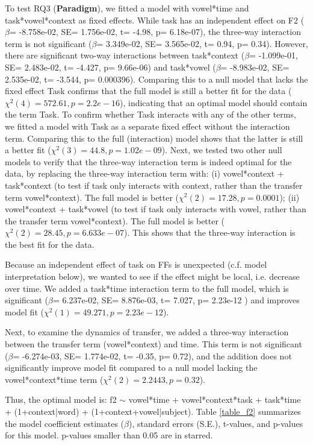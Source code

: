 \documentclass[12 pt]{article}
\begin{document}
To test RQ3 (\textbf{Paradigm}), we fitted a model with vowel*time and task*vowel*context as fixed effects. While task has an independent effect on F2 ($\beta$= -8.758e-02, SE= 1.756e-02, t= -4.98, p= 6.18e-07), the three-way interaction term is not significant ($\beta$= 3.349e-02, SE= 3.565e-02, t= 0.94, p= 0.34). However, there are significant two-way interactions between task*context ($\beta$= -1.099e-01, SE= 2.483e-02, t= -4.427, p= 9.66e-06) and task*vowel ($\beta$= -8.983e-02, SE= 2.535e-02, t= -3.544, p= 0.000396). Comparing this to a null model that lacks the fixed effect Task confirms that the full model is still a better fit for the data ($\chi^2(4) = 572.61, p=  2.2e-16$), indicating that an optimal model should contain the term Task. To confirm whether Task interacts with any of the other terms, we fitted a model with Task as a separate fixed effect without the interaction term. Comparing this to the full (interaction) model shows that the latter is still a better fit ($\chi^2(3) = 44.8, p= 1.02e-09$). Next, we tested two other null models to verify that the three-way interaction term is indeed optimal for the data, by replacing the three-way interaction term with: (i) vowel*context + task*context (to test if task only interacts with context, rather than the transfer term vowel*context). The full model is better ($\chi^2(2) = 17.28, p= 0.0001$); (ii) vowel*context + task*vowel (to test if task only interacts with vowel, rather than the transfer term vowel*context). The full model is better ($\chi^2(2) = 28.45, p= 6.633e-07$). This shows that the three-way interaction is the best fit for the data.

Because an independent effect of task on FFs is unexpected (c.f. model interpretation below), we wanted to see if the effect might be local, i.e. decrease over time. We added a task*time interaction term to the full model, which is significant ($\beta$= 6.237e-02, SE=  8.876e-03, t= 7.027, p= 2.23e-12 ) and improves model fit ($\chi^2(1) = 49.271, p= 2.23e-12$).
	
Next, to examine the dynamics of transfer, we added a three-way interaction between the transfer term (vowel*context) and time. This term is not significant ($\beta$= -6.274e-03, SE= 1.774e-02, t= -0.35, p= 0.72), and the addition does not significantly improve model fit compared to a null model lacking the vowel*context*time term ($\chi^2(2) = 2.2443, p= 0.32$).

Thus, the optimal model is: f2 $\sim$ vowel*time + vowel*context*task + task*time + (1+context|word) + (1+context+vowel|subject). Table \ref{table_f2} summarizes the model coefficient estimates ($\beta$), standard errors (S.E.), t-values, and p-values for this model. p-values smaller than 0.05 are in starred.
\end{document}
